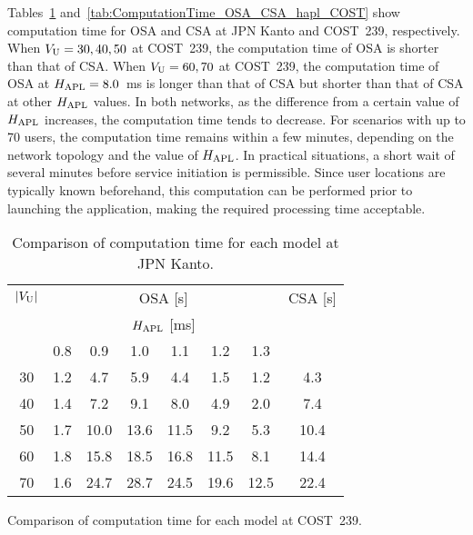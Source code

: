 \documentclass[conference]{IEEEtran}
\begin{document}
\begin{CJK}{UTF8}{ipxm}
Tables~\ref{tab:ComputationTime_OSA_CSA_hapl_JPN} and~\ref{tab:ComputationTime_OSA_CSA_hapl_COST} show computation time for OSA and CSA at JPN Kanto and COST~239, respectively.
When $V_{\rm U} = 30, 40, 50$ at COST~239, the computation time of OSA is shorter than that of CSA.
When $V_{\rm U} = 60, 70$ at COST~239, the computation time of OSA at $H_{\rm APL} = 8.0$~ms is longer than that of CSA but shorter than that of CSA at other $H_{\rm APL}$ values.
In both networks, as the difference from a certain value of $H_{\rm APL}$ increases, the computation time tends to decrease.
For scenarios with up to 70 users, the computation time remains within a few minutes, depending on the network topology and the value of $H_{\rm APL}$. 
In practical situations, a short wait of several minutes before service initiation is permissible.
Since user locations are typically known beforehand, this computation can be performed prior to launching the application, making the required processing time acceptable.
\begin{table}[t]
  \caption{Comparison of computation time for each model at JPN Kanto.}
  \label{tab:ComputationTime_OSA_CSA_hapl_JPN}
  \vspace{-0.3cm}
  \begin{center}
    \begin{tabular}{c|cccccc|c}
      \hline
      $|V_{\rm{U}}|$ & \multicolumn{6}{c|}{OSA [s]} & CSA [s] \\ \cline{2-7}
       & \multicolumn{6}{c|}{$H_{\rm{APL}}$ [ms]} & \\
       & 0.8 & 0.9 & 1.0 & 1.1 & 1.2 & 1.3 &  \\
      \hline
      30 & 1.2 &  4.7 &  5.9 &  4.4 &  1.5 &  1.2 &  4.3 \\
      40 & 1.4 &  7.2 &  9.1 &  8.0 &  4.9 &  2.0 &  7.4 \\
      50 & 1.7 & 10.0 & 13.6 & 11.5 &  9.2 &  5.3 & 10.4 \\
      60 & 1.8 & 15.8 & 18.5 & 16.8 & 11.5 &  8.1 & 14.4 \\
      70 & 1.6 & 24.7 & 28.7 & 24.5 & 19.6 & 12.5 & 22.4 \\
      \hline
    \end{tabular}
  \end{center}
\end{table}
\begin{table}[t]
  \caption{Comparison of computation time for each model at COST~239.}

\end{table}
\end{CJK}
\end{document}
